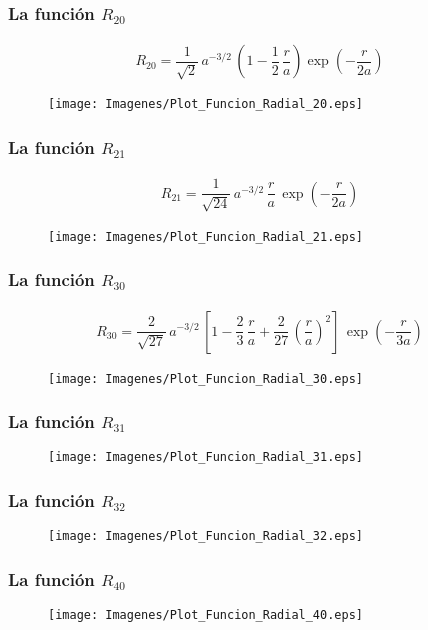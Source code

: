 \documentclass[12pt]{beamer}
\begin{document}
\begin{frame}
\frametitle{La función $R_{20}$}
\begin{align*}
R_{20} = \dfrac{1}{\sqrt{2}} \, a^{-3/2} \, \left( 1 - \dfrac{1}{2} \, \dfrac{r}{a} \right)\exp(-\dfrac{r}{2a})
\end{align*}
\pause
\vspace*{-0.5cm}
\begin{figure}
   \centering
   \texttt{[image: Imagenes/Plot\_Funcion\_Radial\_20.eps]}
\end{figure}
\end{frame}
\begin{frame}
\frametitle{La función $R_{21}$}
\begin{align*}
R_{21} = \dfrac{1}{\sqrt{24}} \, a^{-3/2} \, \dfrac{r}{a} \, \exp(-\dfrac{r}{2a})
\end{align*}
\pause
\vspace*{-0.5cm}
\begin{figure}
   \centering
   \texttt{[image: Imagenes/Plot\_Funcion\_Radial\_21.eps]}
\end{figure}
\end{frame}
\begin{frame}
\frametitle{La función $R_{30}$}
\begin{align*}
R_{30} = \dfrac{2}{\sqrt{27}} \, a^{-3/2} \, \left[ 1 {-} \dfrac{2}{3} \, \dfrac{r}{a} {+} \dfrac{2}{27} \, \left( \dfrac{r}{a} \right)^{2} \right] \, \exp(-\dfrac{r}{3a})
\end{align*}
\pause
\vspace*{-0.5cm}
\begin{figure}
   \centering
   \texttt{[image: Imagenes/Plot\_Funcion\_Radial\_30.eps]}
\end{figure}
\end{frame}
\begin{frame}
   \frametitle{La función $R_{31}$}
\begin{figure}
   \centering
   \texttt{[image: Imagenes/Plot\_Funcion\_Radial\_31.eps]}
\end{figure}
\end{frame}
\begin{frame}
\frametitle{La función $R_{32}$}
\begin{figure}
   \centering
   \texttt{[image: Imagenes/Plot\_Funcion\_Radial\_32.eps]}
\end{figure}
\end{frame}
\begin{frame}
\frametitle{La función $R_{40}$}
\begin{figure}
   \centering
   \texttt{[image: Imagenes/Plot\_Funcion\_Radial\_40.eps]}
\end{figure}
\end{frame}
\end{document}
